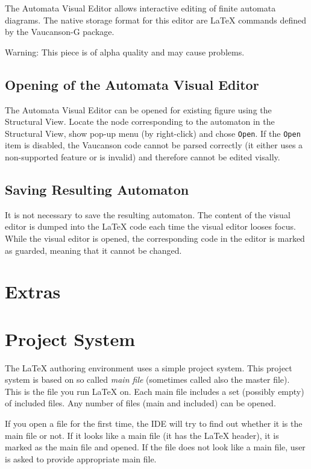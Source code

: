 \documentclass{article}
\newcommand{\lenv}{\LaTeX{} authoring environment\xspace}
\begin{document}
\label{sec:gui:ed}

The Automata Visual Editor allows interactive editing of finite automata diagrams.
The native storage format for this editor are \LaTeX{} commands defined by the Vaucanson-G
package.

Warning: This piece is of alpha quality and may cause problems.

\subsection{Opening of the Automata Visual Editor}

The Automata Visual Editor can be opened for existing figure using the Structural View.
Locate the node corresponding to the automaton in the Structural View, show pop-up
menu (by right-click) and chose \verb+Open+. If the \verb+Open+ item is disabled,
the Vaucanson code cannot be parsed correctly (it either uses a non-supported feature
or is invalid) and therefore cannot be edited visally.

\subsection{Saving Resulting Automaton}

It is not necessary to save the resulting automaton. The content of the visual editor
is dumped into the \LaTeX{} code each time the visual editor looses focus.
While the visual editor is opened, the corresponding code in the editor is marked as
guarded, meaning that it cannot be changed.

\section{Extras}

\section{Project System}

\label{sec:project:system}

The \lenv{} uses a simple project system. This project system is based on so called
\emph{main file} (sometimes called also the master file). This is the
file you run \LaTeX{} on. Each main file includes a set (possibly empty) of included
files. Any number of files (main and included) can be opened.

If you open a file for the first time, the IDE will try to find out whether it is
the main file or not. If it looks like a main file (it has the \LaTeX{} header),
it is marked as the main file and opened. If the file does not look like a main file,
user is asked to provide appropriate main file.
\end{document}
